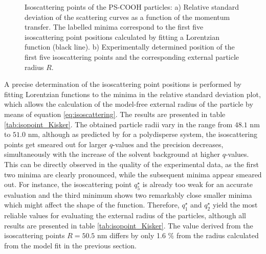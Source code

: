 \begin{figure*}
    \centering
\caption[Isoscattering points of the PS-COOH particles.]{Isoscattering points of the PS-COOH particles: a) Relative standard deviation of the scattering curves as a function of the momentum transfer. The labelled minima correspond to the first five isoscattering point positions calculated by fitting a Lorentzian function (black line). b) Experimentally determined position of the first five isoscattering points and the corresponding external particle radius $R$.}    
\end{figure*}

A precise determination of the isoscattering point positions is performed by fitting Lorentzian functions to the minima in the relative standard deviation plot, which allows the calculation of the model-free external radius of the particle by means of equation \eqref{eq:isoscattering}. The results are presented in table \ref{tab:isopoint_Kisker}. The obtained particle radii vary in the range from \(48.1\) nm to \(51.0\) nm, although as predicted by \cite{kawaguchi_isoscattering_1992} for a polydisperse system, the isoscattering points get smeared out for larger \( q \)-values and the precision decreases, simultaneously with the increase of the solvent background at higher \(q\)-values. This can be directly observed in the quality of the experimental data, as the first two minima are clearly pronounced, while the subsequent minima appear smeared out. For instance, the isoscattering point \(q^{\star}_5\) is already too weak for an accurate evaluation and the third minimum shows two remarkably close smaller minima which might affect the shape of the function. Therefore, \(q^{\star}_1\) and \(q^{\star}_2\) yield the most reliable values for evaluating the external radius of the particles, although all results are presented in table \ref{tab:isopoint_Kisker}. The value derived from the isoscattering points \(R=50.5\) nm differs by only 1.6 $\%$ from the radius calculated from the model fit in the previous section.

